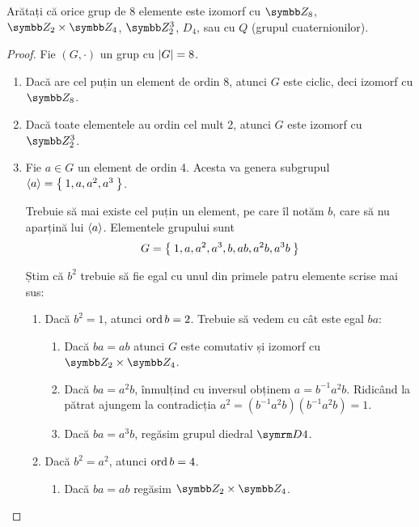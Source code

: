 \begin{exercise}
Arătați că orice grup de 8 elemente este izomorf cu \(\integersmod{8}\), \(\integersmod{2} \times \integersmod{4}\), \(\integersmod{2}^3\), \(D_4\), sau cu \(Q\) (grupul cuaternionilor).
\end{exercise}
\begin{proof}
Fie \((G, \cdot)\) un grup cu \(\left\lvert G \right\rvert = 8\).
\begin{enumerate}
    \item Dacă are cel puțin un element de ordin 8, atunci \(G\) este ciclic, deci izomorf cu \(\integersmod{8}\).

    \item Dacă toate elementele au ordin cel mult 2, atunci \(G\) este izomorf cu \(\integersmod{2}^3\).

    \item Fie \(a \in G\) un element de ordin 4. Acesta va genera subgrupul \(\left\langle a \right\rangle = \Set{ 1, a, a^2, a^3 }\).

    Trebuie să mai existe cel puțin un element, pe care îl notăm \(b\), care să nu aparțină lui \(\left\langle a \right\rangle\). Elementele grupului sunt
    \[
        G = \Set{ 1, a, a^2, a^3, b, a b, a^2 b, a^3 b }
    \]

    \pagebreak

    Știm că \(b^2\) trebuie să fie egal cu unul din primele patru elemente scrise mai sus:
    \begin{enumerate}
        \item Dacă \(b^2 = 1\), atunci \(\operatorname{ord} b = 2\). Trebuie să vedem cu cât este egal \(ba\):
        \begin{enumerate}
            \item Dacă \(ba = ab\) atunci \(G\) este comutativ și izomorf cu \(\integersmod{2} \times \integersmod{4}\).

            \item Dacă \(ba = a^2 b\), înmulțind cu inversul obținem \(a = b^{-1} a^2 b\). Ridicând la pătrat ajungem la contradicția \(a^2 = (b^{-1} a^2 b) (b^{-1} a^2 b) = 1\).

            \item Dacă \(ba = a^3 b\), regăsim grupul diedral \(\dihedralgroup{4}\).
        \end{enumerate}

        \item Dacă \(b^2 = a^2\), atunci \(\operatorname{ord} b = 4\).
        \begin{enumerate}
            \item Dacă \(ba = ab\) regăsim \(\integersmod{2} \times \integersmod{4}\).


\end{enumerate}
\end{enumerate}
\end{enumerate}
\end{proof}
